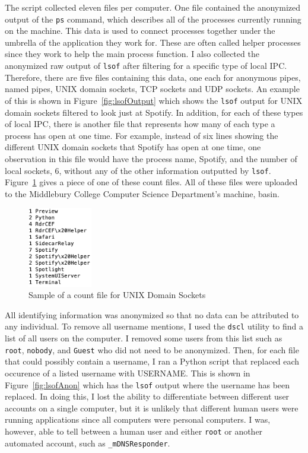 The script collected eleven files per computer.  One file contained the anonymized output of the \texttt{ps} command, which describes all of the processes currently running on the machine.  This data is used to connect processes together under the umbrella of the application they work for.  These are often called helper processes since they work to help the main process function.  I also collected the anonymized raw output of \texttt{lsof} after filtering for a specific type of local IPC.  Therefore, there are five files containing this data, one each for anonymous pipes, named pipes, UNIX domain sockets, TCP sockets and UDP sockets.  An example of this is shown in Figure~\ref{fig:lsofOutput} which shows the \texttt{lsof} output for UNIX domain sockets filtered to look just at Spotify.  In addition, for each of these types of local IPC, there is another file that represents how many of each type a process has open at one time.  For example, instead of six lines showing the different UNIX domain sockets that Spotify has open at one time, one observation in this file would have the process name, Spotify, and the number of local sockets, 6, without any of the other information outputted by \texttt{lsof}.  Figure~\ref{fig:countOutput} gives a piece of one of these count files.  All of these files were uploaded to the Middlebury College Computer Science Department's machine, basin.

\begin{figure}
\centering
\includegraphics[width=0.25\textwidth]{countOutput.png}
\caption{Sample of a count file for UNIX Domain Sockets}
\label{fig:countOutput}
\end{figure}

All identifying information was anonymized so that no data can be attributed to any individual.  To remove all username mentions, I used the \texttt{dscl} utility to find a list of all users on the computer.  I removed some users from this list such as \texttt{root}, \texttt{nobody}, and \texttt{Guest} who did not need to be anonymized.  Then, for each file that could possibly contain a username, I ran a Python script that replaced each occurence of a listed username with USERNAME.  This is shown in Figure~\ref{fig:lsofAnon} which has the \texttt{lsof} output where the username has been replaced.  In doing this, I lost the ability to differentiate between different user accounts on a single computer, but it is unlikely that different human users were running applications since all computers were personal computers.  I was, however, able to tell between a human user and either \texttt{root} or another automated account, such as \texttt{\_mDNSResponder}.

